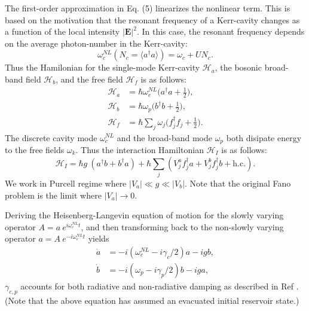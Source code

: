 \documentclass[12pt]{article}
\begin{document}
The first-order approximation in Eq. (5) linearizes the nonlinear term.
This is based on the motivation that the resonant frequency of a Kerr-cavity
changes as a function of the local intensity $|\mathbf{E}|^2$. In this case, 
the resonant frequency depends on the average photon-number in the Kerr-cavity:
\begin{equation}
\omega_c^{NL}( N_c = \langle a^{\dagger}a \rangle )  = \omega_c + UN_c.
\end{equation}
Thus the Hamilonian for the single-mode Kerr-cavity $\mathcal{H}_a$, the 
bosonic broad-band field $\mathcal{H}_b$, and the free field $\mathcal{H}_f$
is as follows:
\begin{align}
\mathcal{H}_a &= \hbar\omega_c^{NL}
    \Big( a^{\dagger}a + \frac{1}{2} \Big),
\\
\mathcal{H}_b &= \hbar\omega_p
    \Big( b^{\dagger}b + \frac{1}{2} \Big),
\\
\mathcal{H}_f &= \hbar \sum_j \omega_j
    \Big( f^{\dagger}_j f_j + \frac{1}{2} \Big).
\end{align}
The discrete cavity mode $\omega_c^{NL}$ and the broad-band mode $\omega_p$
both disipate energy to the free fields $\omega_k$. Thus the interaction
Hamiltonian $\mathcal{H}_{I}$ is as follows:
\begin{equation}
\mathcal{H}_I = \hbar g \: (
    a^{\dagger}b + b^{\dagger}a )
    + \hbar \sum_j ( V_j^a f^{\dagger}_j a 
        + V_j^b f^{\dagger}_j b + \mathrm{h.c.} ).
\end{equation}
We work in Purcell regime where $|V_a| \ll g \ll |V_b|$. Note that the
original Fano problem is the limit where $|V_a| \rightarrow 0$.

Deriving the Heisenberg-Langevin equation of motion for the slowly varying
operator $A = a \: e^{i\omega_c^{NL} t}$, and then 
transforming back to the non-slowly varying operator $ a = 
A \: e^{-i\omega_c^{NL} t}$ yields
\begin{align}
\dot{ a } &= -i ( \omega_c^{NL} - i\gamma_c/2 ) a 
    - ig b,
\\
\dot{b} &= -i ( \omega_p - i\gamma_p/2 ) b
    - ig a,
\end{align}
$\gamma_{c,p}$ accounts for both radiative and non-radiative damping as
described in Ref \cite{thakkar2015quantum}. (Note that the above equation
has assumed an evacuated initial reservoir state.)
\end{document}
